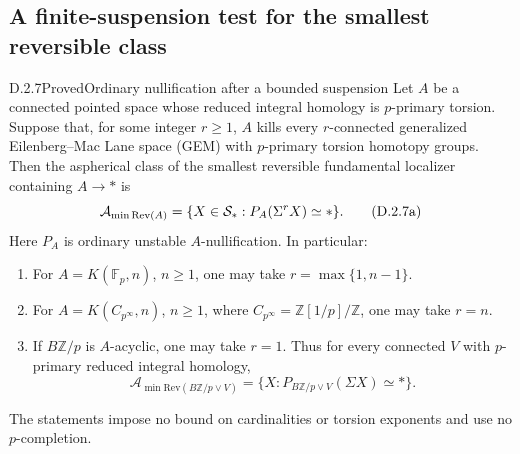 \subsection*{A finite-suspension test for the smallest reversible class}

\begin{claim}{D.2.7}{Proved}{Ordinary nullification after a bounded suspension}
\label{D27nullification}
Let $A$ be a connected pointed space whose reduced integral homology is
$p$-primary torsion. Suppose that, for some integer $r\geq1$, $A$ kills
every $r$-connected generalized Eilenberg--Mac Lane space (GEM) with
$p$-primary torsion homotopy groups. Then the aspherical class of the
smallest reversible fundamental localizer containing $A\to *$ is
\[
 \mathcal A_{\min\mathrm{Rev}(A)}
   =\{X\in\mathcal S_*:P_A(\Sigma^rX)\simeq *\}.
 \tag{D.2.7a}
\]
Here $P_A$ is ordinary unstable $A$-nullification. In particular:
\begin{enumerate}
\item For $A=K(\mathbb F_p,n)$, $n\geq1$, one may take
      $r=\max\{1,n-1\}$.
\item For $A=K(C_{p^\infty},n)$, $n\geq1$, where
      $C_{p^\infty}=\mathbb Z[1/p]/\mathbb Z$, one may take $r=n$.
\item If $B\mathbb Z/p$ is $A$-acyclic, one may take $r=1$.
      Thus for every connected $V$ with $p$-primary reduced integral
      homology,
\[
 \mathcal A_{\min\mathrm{Rev}(B\mathbb Z/p\vee V)}
  =\{X:P_{B\mathbb Z/p\vee V}(\Sigma X)\simeq *\}.
 \tag{D.2.7b}
\]
\end{enumerate}
The statements impose no bound on cardinalities or torsion exponents
and use no $p$-completion.
\end{claim}

